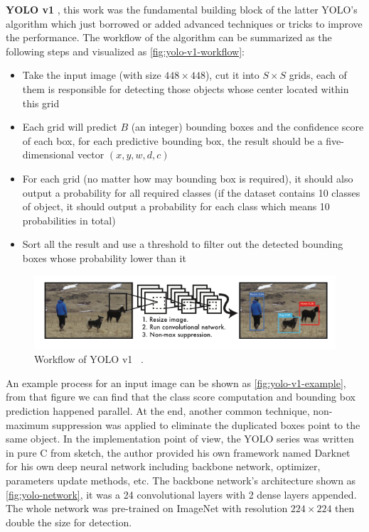 \textbf{YOLO v1} \cite{yolov1-paper-2015}, this work was the fundamental
building block of the latter YOLO's algorithm
which just borrowed or added advanced techniques or tricks to improve the
performance. The workflow of the algorithm can
be summarized as the following steps and visualized as
\autoref{fig:yolo-v1-workflow}:

\begin{itemize}
    \item Take the input image (with size $448 \times 448$), cut it into $S
    \times S$ grids, each of them is responsible for detecting those objects
    whose center located within this grid

    \item Each grid will predict $B$ (an integer) bounding boxes and the
    confidence score of each box, for each predictive bounding box, the result
    should be a five-dimensional vector $(x, y, w, d, c)$

    \item For each grid (no matter how may bounding box is required), it should
    also output a probability for all required classes (if the dataset contains
    10 classes of object, it should output a probability for each class which
    means 10 probabilities in total)

    \item Sort all the result and use a threshold to filter out the detected
    bounding boxes whose probability lower than it
\end{itemize}

\begin{figure}
    \includegraphics[width=\linewidth]{figures/yolo_v1_workflow.png}
    \caption{Workflow of YOLO v1 ~\protect\cite{yolov1-paper-2015}.}
    \label{fig:yolo-v1-workflow}
\end{figure}

An example process for an input image can be shown as
\autoref{fig:yolo-v1-example}, from that figure we can find that the
class score computation and bounding box prediction happened parallel. At
the end, another common technique, non-maximum
suppression \cite{non-maximum-suppression-paper} was applied to eliminate the
duplicated boxes point to the same object.
In the implementation point of view, the YOLO series was written in pure C from
sketch, the author provided his own framework
named Darknet \cite{darknet13} for his own deep neural network including
backbone network, optimizer, parameters update
methods, etc. The backbone network's architecture shown as
\autoref{fig:yolo-network}, it was a 24 convolutional layers
with 2 dense layers appended. The whole network was pre-trained on ImageNet
with resolution $224 \times 224$ then
double the size for detection.


